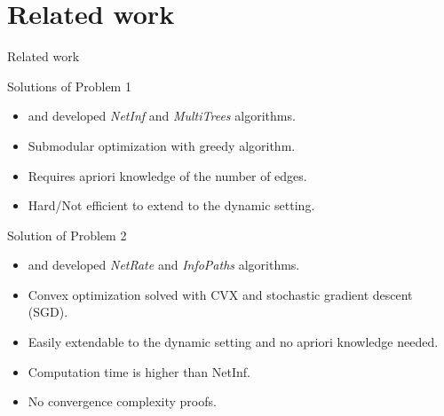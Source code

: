 \documentclass{beamer}
\begin{document}
\section{Related work}
\begin{frame}{Related work}
\begin{block}{Solutions of Problem 1}
\begin{itemize}
    \item \cite{NetInf} and \cite{MultiTrees} developed \textit{NetInf} and \textit{MultiTrees} algorithms.
    \item Submodular optimization with greedy algorithm.
    \item Requires apriori knowledge of the number of edges.
    \item Hard/Not efficient to extend to the dynamic setting.
\end{itemize}
\end{block}
\begin{block}{Solution of Problem 2}
\begin{itemize}
    \item \cite{NetRate} and \cite{InfoPath} developed \textit{NetRate} and \textit{InfoPaths} algorithms.
    \item Convex optimization solved with CVX and stochastic gradient descent (SGD).
    \item Easily extendable to the dynamic setting and no apriori knowledge needed.
    \item Computation time is higher than NetInf.
    \item No convergence complexity proofs.
\end{itemize}
\end{block}
\end{frame}
\end{document}
